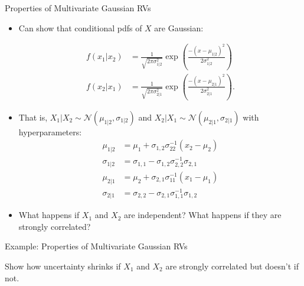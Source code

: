 \documentclass[9pt]{beamer}
\begin{document}
%
\begin{frame}{Properties of Multivariate Gaussian RVs}

\begin{itemize}

\item Can show that conditional pdfs of $X$ are Gaussian:
\begin{block}{}
\begin{align*}
f(x_1|x_2)&=\frac{1}{\sqrt{2\pi\sigma_{1|2}^2}}\exp \left({\frac{-(x-\mu_{1|2})^2}{2\sigma_{1|2}^2}}\right)\\
f(x_2|x_1)&=\frac{1}{\sqrt{2\pi\sigma_{2|1}^2}}\exp \left({\frac{-(x-\mu_{2|1})^2}{2\sigma_{2|1}^2}}\right).
\end{align*} 
\end{block}
\item That is, $X_1|X_2\sim \mathcal{N}(\mu_{1|2},\sigma_{1|2})$ and $X_2|X_1\sim \mathcal{N}(\mu_{2|1},\sigma_{2|1})$ with hyperparameters:
\begin{align*}
\mu_{1|2}&=\mu_1+\sigma_{1,2}\sigma_{22}^{-1}(x_2-\mu_2)\\
\sigma_{1|2}&=\sigma_{1,1}-\sigma_{1,2}\sigma_{2,2}^{-1}\sigma_{2,1}\\
\mu_{2|1}&=\mu_2+\sigma_{2,1}\sigma_{11}^{-1}(x_1-\mu_1)\\
\sigma_{2|1}&=\sigma_{2,2}-\sigma_{2,1}\sigma_{1,1}^{-1}\sigma_{1,2}
\end{align*}
\item What happens if $X_1$ and $X_2$ are independent? What happens if they are strongly correlated?
\end{itemize}

\end{frame}

%
\begin{frame}{Example: Properties of Multivariate Gaussian RVs}

\begin{block}{}
Show how uncertainty shrinks if $X_1$ and $X_2$ are strongly correlated but doesn't if not. 
\end{block}

\end{frame}
\end{document}
